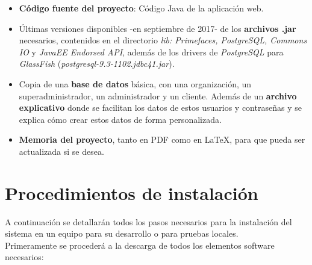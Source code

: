 \begin{itemize}
\item \textbf{Código fuente del proyecto}: Código Java de la aplicación web.
\item Últimas versiones disponibles -en septiembre de 2017- de los \textbf{archivos .jar} necesarios, contenidos en el directorio \textit{lib: Primefaces, PostgreSQL, Commons IO} y \textit{JavaEE Endorsed API}, además de los drivers de \textit{PostgreSQL} para \textit{GlassFish} (\textit{postgresql-9.3-1102.jdbc41.jar}).
\item Copia de una \textbf{base de datos} básica, con una organización, un superadministrador, un administrador y un cliente. Además de un \textbf{archivo explicativo} donde se facilitan los datos de estos usuarios y contraseñas y se explica cómo crear estos datos de forma personalizada. 
\item \textbf{Memoria del proyecto}, tanto en PDF como en \LaTeX, para que pueda ser actualizada si se desea. 
\end{itemize}


\section{Procedimientos de instalación}

A continuación se detallarán todos los pasos necesarios para la instalación del sistema en un equipo para su desarrollo o para pruebas locales. \\

Primeramente se procederá a la descarga de todos los elementos software necesarios: 

